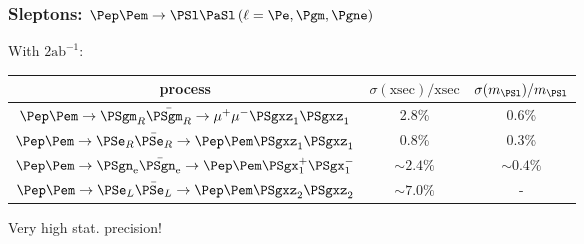 \documentclass{beamer}
\begin{document}
\begin{frame}
\frametitle{Sleptons: $\Pep\Pem \to \PSl \PaSl \,(\ell = \Pe,\Pgm,\Pgne)$}
With $2\textrm{ab}^{-1}$:
\begin{center}
\begin{tabular}{ccc}
process & $\sigma(\textrm{xsec})/\textrm{xsec}$ & $\sigma(m_{\PSl})/m_{\PSl}$\\
\midrule
$\Pep\Pem \to \PSgm_R\bar{\PSgm_R} \to \mu^+\mu^-\PSgxz_1\PSgxz_1$ & 2.8\%
&0.6\%\\ $\Pep\Pem \to \PSe_R\bar{\PSe_R} \to \Pep\Pem\PSgxz_1\PSgxz_1$ & 0.8\% & 0.3\%\\
$\Pep\Pem \to \PSgn_{\textrm{e}}\bar{\PSgn_{\textrm{e}}} \to
\Pep\Pem\PSgx^+_1\PSgx^-_1$ & $\sim2.4\%$ & $\sim0.4\%$ \\ $\Pep\Pem \to \PSe_L\bar{\PSe_L} \to \Pep\Pem\PSgxz_2\PSgxz_2$ & $\sim7.0\%$ &
-\\
\bottomrule
\end{tabular}
\end{center}
\alert{Very high stat. precision!}
\end{frame}
\end{document}
